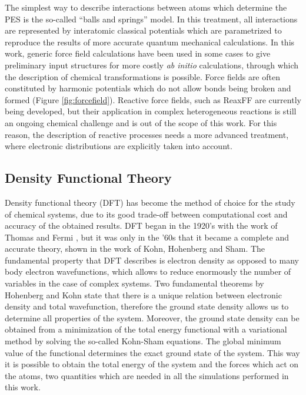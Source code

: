 The simplest way to describe interactions between atoms which determine the PES is the so-called ``balls and springs'' model. In this treatment, all interactions are represented by interatomic classical potentials which are parametrized to reproduce the results of more accurate quantum mechanical calculations. In this work, generic force field calculations have been used in some cases to give preliminary input structures for more costly \textit{ab initio} calculations, through which the description of chemical transformations is possible. 
Force fields are often constituted by harmonic potentials which do not allow bonds being broken and formed (Figure \ref{fig:forcefield}). Reactive force fields, such as ReaxFF \cite{VanDuin2001} are currently being developed, but their application in complex heterogeneous reactions is still an ongoing chemical challenge and is out of the scope of this work. For this reason, the description of reactive processes needs a more advanced treatment, where electronic distributions are explicitly taken into account.

\subsection{Density Functional Theory}
Density functional theory (DFT) has become the method of choice for the study of chemical systems, due to its good trade-off between computational cost and accuracy of the obtained results. DFT began in the 1920’s with the work of Thomas and Fermi  \cite{Thomas1927, Fermi1928}, but it was only in the ’60s that it became a complete and accurate theory, shown in the work of Kohn, Hohenberg and Sham\cite{Hohenberg1964}. The fundamental property that DFT describes is electron density as opposed to many body electron wavefunctions, which allows to reduce enormously the number of variables in the case of complex systems. Two fundamental theorems by Hohenberg and Kohn state that there is a unique relation between electronic density and total wavefunction, therefore the ground state density allows us to determine all properties of the system. Moreover, the ground state density can be obtained from a minimization of the total energy functional with a variational method by solving the so-called Kohn-Sham equations. The global minimum value of the functional determines the exact ground state of the system. This way it is possible to obtain the total energy of the system and the forces which act on the atoms, two quantities which are needed in all the simulations performed in this work. 

